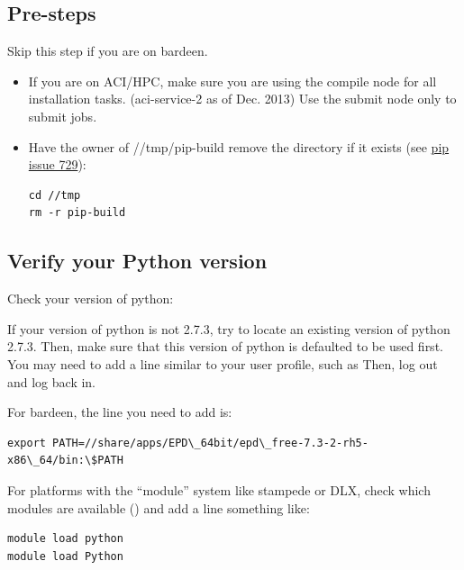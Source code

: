 \documentclass[letterpaper,10pt,english]{sphinxmanual}
\begin{document}
\subsection{Pre-steps}
\label{1_0_installation:pre-steps}
Skip this step if you are on bardeen.
\begin{itemize}
\item {} 
If you are on ACI/HPC, make sure you are using the compile node for all installation tasks. (aci-service-2 as of Dec. 2013) Use the submit node only to submit jobs.

\item {} 
Have the owner of //tmp/pip-build remove the directory if it exists (see \href{https://github.com/pypa/pip/issues/729}{pip issue 729}):

\begin{Verbatim}[commandchars=\\\{\}]
cd //tmp
rm -r pip-build
\end{Verbatim}

\end{itemize}


\subsection{Verify your Python version}
\label{1_0_installation:verify-your-python-version}
Check your version of python: 

If your version of python is not 2.7.3, try to locate an existing version of python 2.7.3.
Then, make sure that this version of python is defaulted to be used first. You may need to add a line similar to your user profile, such as 
Then, log out and log back in.

For bardeen, the line you need to add is:

\begin{Verbatim}[commandchars=\\\{\}]
export PATH=//share/apps/EPD\_64bit/epd\_free-7.3-2-rh5-x86\_64/bin:\$PATH
\end{Verbatim}

For platforms with the ``module'' system like stampede or DLX, check which modules are available () and add a line something like:

\begin{Verbatim}[commandchars=\\\{\}]
module load python
module load Python
\end{Verbatim}
\end{document}
